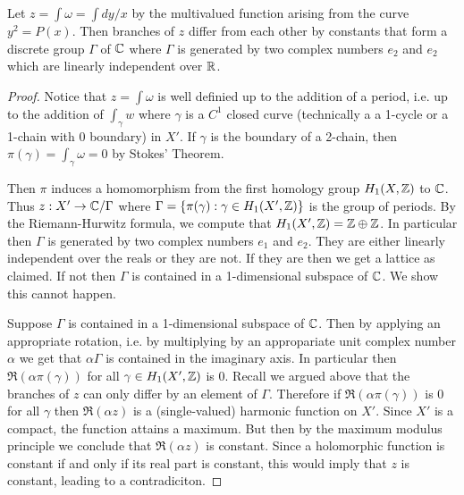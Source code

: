 \begin{lemma}
    Let $z = \int \omega = \int dy/x$ by the multivalued function arising from the curve $y^2 = P(x)$. Then branches of $z$ differ from each other by constants that form a discrete group $\Gamma$ of $\mathbb{C}$ where $\Gamma$ is generated by two complex numbers $e_2$ and $e_2$ which are linearly independent over $\mathbb{R}$. 
\end{lemma}
\begin{proof}
    Notice that $z = \int \omega$ is well definied up to the addition of a period, i.e. up to the addition of $\int_\gamma w$ where $\gamma$ is a $C^1$ closed curve (technically a a 1-cycle or a 1-chain with 0 boundary) in $X'$. If $\gamma$ is the boundary of a 2-chain, then $\pi(\gamma) = \int_\gamma \omega = 0$ by Stokes' Theorem. 

    Then $\pi$ induces a homomorphism from the first homology group $H_1(X, \mathbb{Z})$ to $\mathbb{C}$. Thus $z: X' \to \mathbb{C}/\Gamma$ where $\Gamma = \{\pi(\gamma) : \gamma \in H_1(X', \mathbb{Z})\}$ is the group of periods. By the Riemann-Hurwitz formula, we compute that $H_1(X', \mathbb{Z}) = \mathbb{Z} \oplus \mathbb{Z}$. In particular then $\Gamma$ is generated by two complex numbers $e_1$ and $e_2$. They are either linearly independent over the reals or they are not. If they are then we get a lattice as claimed. If not then $\Gamma$ is contained in a 1-dimensional subspace of $\mathbb{C}$. We show this cannot happen.

    Suppose $\Gamma$ is contained in a 1-dimensional subspace of $\mathbb{C}$. Then by applying an appropriate rotation, i.e. by multiplying by an appropariate unit complex number $\alpha$ we get that $\alpha \Gamma$ is contained in the imaginary axis. In particular then $\Re(\alpha \pi(\gamma))$ for all $\gamma \in H_1(X', \mathbb{Z})$ is 0. Recall we argued above that the branches of $z$ can only differ by an element of $\Gamma$. Therefore if $\Re(\alpha \pi(\gamma))$ is 0 for all $\gamma$ then $\Re(\alpha z)$ is a (single-valued) harmonic function on $X'$. Since $X'$ is a compact, the function attains a maximum. But then by the maximum modulus principle we conclude that $\Re(\alpha z)$ is constant. Since a holomorphic function is constant if and only if its real part is constant, this would imply that $z$ is constant, leading to a contradiciton. 


\end{proof}
